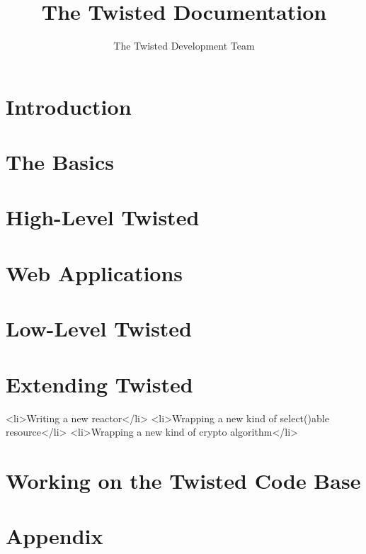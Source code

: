 \documentclass{book}
\title{The Twisted Documentation}
\author{The Twisted Development Team}
\begin{document}
\maketitle

\chapter{Introduction}











\chapter{The Basics}









\chapter{High-Level Twisted}












\chapter{Web Applications }








\chapter{Low-Level Twisted }












\chapter{Extending Twisted}

    <li>Writing a new reactor</li>
    <li>Wrapping a new kind of select()able resource</li>
    <li>Wrapping a new kind of crypto algorithm</li>



\chapter{Working on the Twisted Code Base}






\chapter{Appendix}



\end{document}
